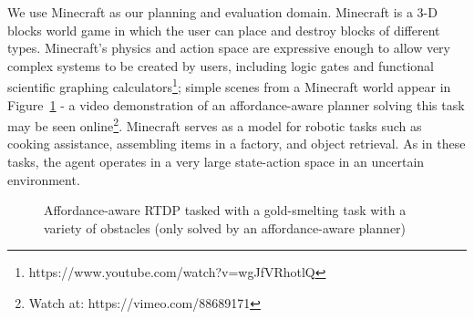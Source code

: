 \documentclass[letterpaper]{article}
\begin{document}
We use Minecraft as our planning and evaluation domain. Minecraft is a
3-D blocks world game in which the user can place and destroy blocks
of different types.  Minecraft's physics and action space are expressive
enough to allow very complex systems to be created by users, including logic gates and 
functional scientific graphing calculators\footnote{https://www.youtube.com/watch?v=wgJfVRhotlQ};
simple scenes from a Minecraft world appear in Figure~\ref{fig:epicworld} - a video demonstration of
an affordance-aware planner solving this task may be seen online\footnote{Watch at: https://vimeo.com/88689171}.
Minecraft serves as a model for robotic tasks such as cooking assistance, assembling items in a factory, 
and object retrieval.  As in these tasks, the agent operates in a very large state-action space in an uncertain environment.

\begin{figure}
\centering
{}%
%
%
%
  \caption{Affordance-aware RTDP tasked with a gold-smelting task with a variety of obstacles
  (only solved by an affordance-aware planner)}
  \label{fig:epicworld}
\end{figure}
\end{document}
